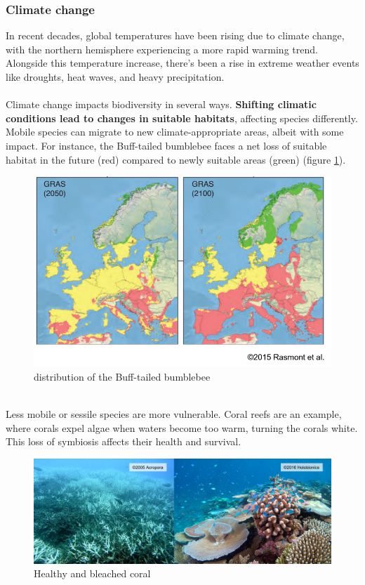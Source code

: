 \documentclass[../summary.tex]{subfiles}
\begin{document}
\subsubsection{Climate change}

In recent decades, global temperatures have been rising due to climate change, with the northern hemisphere experiencing a more rapid warming trend. Alongside this temperature increase, there's been a rise in extreme weather events like droughts, heat waves, and heavy precipitation.\\
\\
Climate change impacts biodiversity in several ways. \textbf{Shifting climatic conditions lead to changes in suitable habitats}, affecting species differently. Mobile species can migrate to new climate-appropriate areas, albeit with some impact. For instance, the Buff-tailed bumblebee faces a net loss of suitable habitat in the future (red) compared to newly suitable areas (green) (figure \ref{fig:bumblebeedistribution}).

\begin{figure}[H]
	\centering
	\includegraphics[width=0.7\linewidth]{../images/Bumblebee_distribution}
	\caption{distribution of the Buff-tailed bumblebee}
	\label{fig:bumblebeedistribution}
\end{figure}
\ \\
Less mobile or sessile species are more vulnerable. Coral reefs are an example, where corals expel algae when waters become too warm, turning the corals white. This loss of symbiosis affects their health and survival.

\begin{figure}[H]
	\centering
	\includegraphics[width=0.7\linewidth]{../images/healthy_and_bleached_coral}
	\caption{Healthy and bleached coral}
	\label{fig:healthyandbleachedcoral}
\end{figure}
\end{document}

